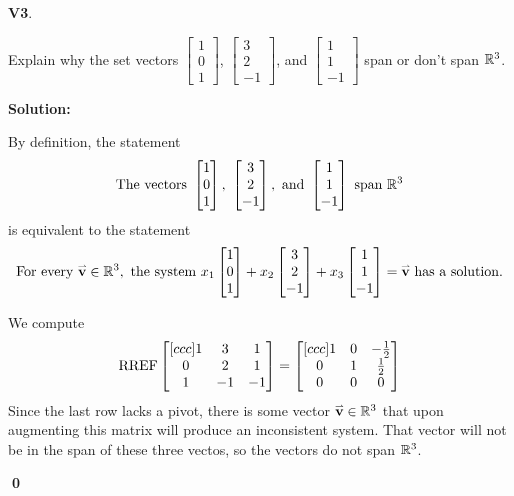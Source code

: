 \documentclass{article}
\newenvironment{problem}[1]
{
  \begin{flushleft}
  \textbf{#1}.
  \ignorespaces
}
{
  \end{flushleft}
}
\newenvironment{solution}
{
  \ignorespaces
  \textbf{Solution:}
}
{
  \ignorespacesafterend
  \begin{flushright}
  {\bfseries \qed}
  \end{flushright}
}
\begin{document}
\begin{problem}{V3}
Explain why the set vectors
\(\begin{bmatrix} 1 \\ 0 \\ 1 \end{bmatrix} \),
\(\begin{bmatrix} 3 \\ 2 \\ -1 \end{bmatrix} \), and
\(\begin{bmatrix} 1 \\ 1 \\ -1 \end{bmatrix} \) span or don't span \(\mathbb{R}^3\).
\end{problem}
\begin{solution}
By definition, the statement
\[\text{The vectors }\begin{bmatrix} 1 \\ 0 \\ 1 \end{bmatrix} ,\ 
\begin{bmatrix} 3 \\ 2 \\ -1 \end{bmatrix}, \text{ and }
\begin{bmatrix} 1 \\ 1 \\ -1 \end{bmatrix}  \text{ span } \IR^3\]
is equivalent to the statement
\[\text{For every }\mathbf{\accentset{\rightharpoonup}{v}} \in \mathbb{R}^3,\text{ the system }
x_1\begin{bmatrix} 1 \\ 0 \\ 1 \end{bmatrix}+  
x_2 \begin{bmatrix} 3 \\ 2 \\ -1 \end{bmatrix}+
x_3\begin{bmatrix} 1 \\ 1 \\ -1 \end{bmatrix}=\mathbf{\accentset{\rightharpoonup}{v}}\text{ has a solution.}\]


We compute
\[ \operatorname{RREF}
  \begin{bmatrix}[ccc]
  1 & 3 & 1  \\
  0 & 2 & 1  \\
  1 & -1 & -1
  \end{bmatrix}
  =
  \begin{bmatrix}[ccc]
  1 & 0 & -\frac{1}{2} \\
  0 & 1 & \frac{1}{2} \\
  0 & 0 & 0
  \end{bmatrix}
\]
Since the last row lacks a pivot, there is some vector \(\mathbf{\accentset{\rightharpoonup}{v}} \in \mathbb{R}^3\) that upon augmenting this matrix will produce
an inconsistent system. That vector will not be in the span of these three vectos, so the vectors do not span \(\mathbb{R}^3\).
\end{solution}
\end{document}
